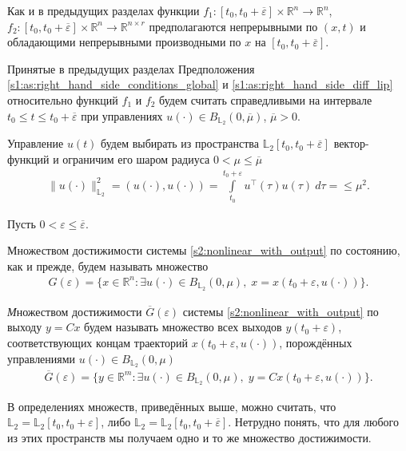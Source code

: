 \documentclass[../main.tex]{subfiles}
\begin{document}
Как и в предыдущих разделах функции $ f_1: [t_0, t_0 + \overline{\varepsilon}] \times \mathbb{R}^{n} \rightarrow \mathbb{R}^{n} $, $ f_2: [t_0, t_0 + \overline{\varepsilon}] \times \mathbb{R}^{n} \rightarrow \mathbb{R}^{n \times r} $ предполагаются непрерывными по $(x, t)$ и обладающими непрерывными производными по $x$ на $ [t_0, t_0 + \overline{\varepsilon}]$. 

Принятые в предыдущих разделах Предположения \ref{s1:as:right_hand_side_conditions_global} и \ref{s1:as:right_hand_side_diff_lip} относительно функций $f_1$ и $f_2$ будем считать справедливыми на интервале $t_0 \leqslant t \leqslant t_0 + \overline{\varepsilon} $ при управлениях $u(\cdot) \in B_{\mathbb{L}_2}(0, \overline{\mu}) $, $\overline{\mu} > 0$.

 Управление $u(t)$ будем выбирать из
пространства $\mathbb{L}_2[t_0,t_0+\overline{\varepsilon}]$ вектор-функций и ограничим его шаром радиуса $ 0 < \mu \leqslant \overline{\mu} $
\begin{gather}\label{s2:constrY}
 \lVert u(\cdot)\rVert^2_{\mathbb{L}_2} = \left(u(\cdot),u(\cdot) \right) = \int\limits_{t_0}^{t_0 + \varepsilon} u^{\top}(\tau) u(\tau) \ d\tau = \leqslant \mu^2.
\end{gather}

Пусть $ 0 < \varepsilon \leqslant \overline{\varepsilon} $. 

Множеством достижимости системы \eqref{s2:nonlinear_with_output} по состоянию, как и прежде, будем называть множество 
\begin{gather*}
 G(\varepsilon)=\{x\in \mathbb{R}^n:\exists u(\cdot)\in B_{\mathbb{L}_2}(0,\mu),\; x=x(t_0+\varepsilon, u(\cdot))\}.
\end{gather*}


\begin{definition}
 {\textit Множеством достижимости $\overline{G}(\varepsilon)$ системы \eqref{s2:nonlinear_with_output} по выходу} $ y = C x $ будем называть множество всех выходов $ y(t_0+\varepsilon) $,
 соответствующих концам траекторий $ x(t_0+\varepsilon, u(\cdot)) $, порождённых управлениями $ u(\cdot) \in B_{\mathbb{L}_2}(0,\mu)$
 \begin{gather*}
 \overline{G}(\varepsilon)=\{y\in \mathbb{R}^m:\exists u(\cdot)\in B_{\mathbb{L}_2}(0,\mu),\; y=Cx(t_0+\varepsilon, u(\cdot))\}.
 \end{gather*}
\end{definition}

В определениях множеств, приведённых выше, можно считать, что $ \mathbb{L}_2 =\mathbb{L}_2[t_0,t_0+\varepsilon] $, либо $ \mathbb{L}_2=\mathbb{L}_2[t_0,t_0+\overline{\varepsilon}] $.
Нетрудно понять, что для любого из этих пространств мы получаем одно и то же множество достижимости. 
 
\end{document}

